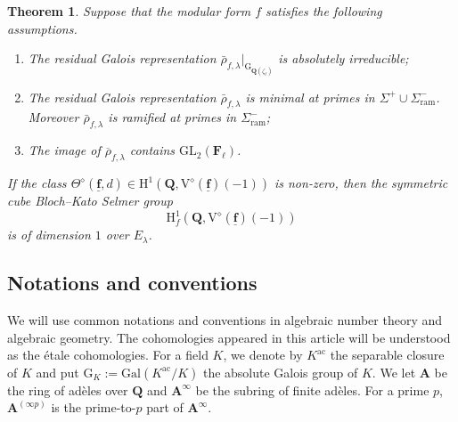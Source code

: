 \documentclass[10pt]{amsart}
\numberwithin{equation}{section}
\theoremstyle{plain}
\numberwithin{equation}{section}
\newtheorem{thm}{Theorem}
\theoremstyle{definition}
\theoremstyle{remark}
\def\Gal{\mathrm{Gal}}
\def\GL{\mathrm{GL}}
\def\ac{\mathrm{ac}}
\def\ac{\mathrm{ac}}
\def\ram{\mathrm{ram}}
\def\triplef{\underline{\mathbf{f}}}
\def\Adel{\mathbf{A}}
\def\FF{\mathbf{F}}
\def\QQ{\mathbf{Q}}
\def\rmG{\mathrm{G}}
\def\rmH{\mathrm{H}}
\def\rmV{\mathrm{V}}
\begin{document}
\begin{thm}\label{intro-rank-1}
Suppose that the modular form $f$ satisfies the following assumptions.
\begin{enumerate}
\item The residual Galois representation $\bar{\rho}_{f, \lambda}\vert_{\rmG_{\QQ(\zeta_{\ell})}}$ is absolutely irreducible;
\item The residual Galois representation $\bar{\rho}_{f, \lambda}$ is minimal at primes in $\Sigma^{+}\cup\Sigma^{-}_{\ram}$. Moreover $\bar{\rho}_{f, \lambda}$ is ramified at primes in $\Sigma^{-}_{\ram}$;
\item The image of $\overline{\rho}_{f, \lambda}$ contains $\GL_{2}(\FF_{\ell})$.
\end{enumerate}
If the class $\Theta^{\diamond}(\triplef,d)\in \rmH^{1}(\QQ, \rmV^{\diamond}({\triplef})(-1))$ is non-zero, then the symmetric cube Bloch--Kato Selmer group 
\begin{equation*}
\rmH^{1}_{f}(\QQ, \mathrm{V}^{\diamond}(\triplef)(-1)) 
\end{equation*}
is of dimension $1$ over $E_{\lambda}$.
\end{thm}

\subsection{Notations and conventions} We will use common notations and conventions in algebraic number theory and algebraic geometry. The cohomologies appeared in this article will be understood as the \'{e}tale cohomologies. For a field $K$, we denote by $K^{\ac}$ the separable closure of $K$ and put $\rmG_{K}:=\Gal(K^{\ac}/K)$ the absolute Galois group of $K$. We let $\Adel$ be the ring of ad\`{e}les over $\QQ$ and $\Adel^{\infty}$ be the subring of finite ad\`{e}les.  For a prime $p$, $\Adel^{(\infty p)}$ is the prime-to-$p$ part of  $\Adel^{\infty}$. 
\end{document}
